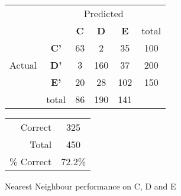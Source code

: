 \begin{figure}[!ht]
\begin{minipage}[b]{0.5\linewidth}
\centering
	\begin{tabular}{ccc|c|c|c}
	 & &\multicolumn{3}{c}{Predicted} &\\
	  & & \bf{C} &  \bf{D} & \bf{E} & total \\
	 \cline{3-6}
	 \multirow{3}{*}{\begin{sideways}Actual\end{sideways}} & \bf{C'}& 63 & 2 & 35 & 100\\
	 \cline{3-6}
	 & \bf{D'}& 3 & 160 & 37 & 200\\
	  \cline{3-6}
	 & \bf{E'}& 20 & 28 & 102 &  150\\
	  \cline{3-6}
	 &total&86&190&141\\
	\end{tabular}
\end{minipage}
\hspace{0.5cm}
\begin{minipage}[b]{0.5\linewidth}
	\begin{tabular}{r|c}
	\hline
	Correct& 325\\
	Total& 450 \\
	\hline
	\% Correct& 72.2\%\\
	\hline
	\end{tabular}
\end{minipage}
\vspace{1mm}
\caption{Nearest Neighbour performance on C, D and E}
\end{figure}

\clearpage

